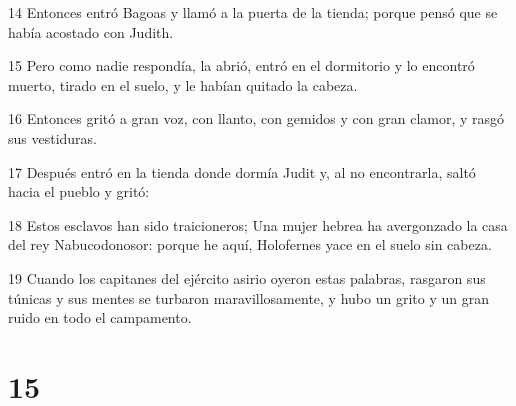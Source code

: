 \par 14 Entonces entró Bagoas y llamó a la puerta de la tienda; porque pensó que se había acostado con Judith.
\par 15 Pero como nadie respondía, la abrió, entró en el dormitorio y lo encontró muerto, tirado en el suelo, y le habían quitado la cabeza.
\par 16 Entonces gritó a gran voz, con llanto, con gemidos y con gran clamor, y rasgó sus vestiduras.
\par 17 Después entró en la tienda donde dormía Judit y, al no encontrarla, saltó hacia el pueblo y gritó:
\par 18 Estos esclavos han sido traicioneros; Una mujer hebrea ha avergonzado la casa del rey Nabucodonosor: porque he aquí, Holofernes yace en el suelo sin cabeza.
\par 19 Cuando los capitanes del ejército asirio oyeron estas palabras, rasgaron sus túnicas y sus mentes se turbaron maravillosamente, y hubo un grito y un gran ruido en todo el campamento.

\chapter{15}

